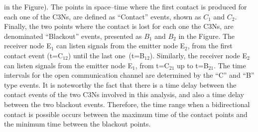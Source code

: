 \documentclass[crop]{CSLB}
\newcommand{\cetis}{C3Ns}
\begin{document}
in the Figure).
%
The points in space--time where the first contact is produced for each
one of the \cetis{}, are defined as ``Contact'' events, shown as $C_1$
and $C_2$.
%
Finally, the two points where the contact is lost for each one the
\cetis{}, are denominated ``Blackout'' events, presented as $B_1$ and
$B_2$ in the Figure.
%
The receiver node E$_1$ can listen signals from the emitter node
E$_2$, from the first contact event (t=C$_{12}$) until the last
one (t=B$_{12}$).
%
Similarly, the receiver node E$_2$ can listen signals from the emitter
node E$_1$, from t=C$_{21}$ up to t=B$_{21}$.
%
The time intervals for the open communication channel are determined
by the ``C'' and ``B'' type events.
%
It is noteworthy the fact that there is a time delay between the
contact events of the two \cetis{} involved in this analysis, and also
a time delay between the two blackout events.
%
Therefore, the time range when a bidirectional contact is possible
occurs between the maximum time of the contact points and the minimum
time between the blackout points.
\end{document}
